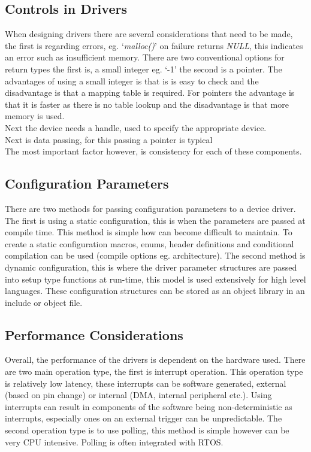 \subsection{Controls in Drivers}
When designing drivers there are several considerations that need to be made, the first is regarding
errors, eg. `\textit{malloc()}' on failure returns \textit{NULL}, this indicates an error such as
insufficient memory. There are two conventional options for return types the first is, a small
integer eg. `-1' the second is a pointer. The advantages of using a small integer is that is is easy
to check and the disadvantage is that a mapping table is required. For pointers the advantage is
that it is faster as there is no table lookup and the disadvantage is that more memory is used.\\

\noindent Next the device needs a handle, used to specify the appropriate device.\\

\noindent Next is data passing, for this passing a pointer is typical\\

\noindent The most important factor however, is consistency for each of these components.

\subsection{Configuration Parameters}
There are two methods for passing configuration parameters to a device driver. The first is using a
static configuration, this is when the parameters are passed at compile time. This method is simple
how can become difficult to maintain. To create a static configuration macros, enums, header
definitions and conditional compilation can be used (compile options eg.
architecture). The second method is dynamic configuration, this is where the driver parameter
structures are passed into setup type functions at run-time, this model is used extensively for high
level languages. These configuration structures can be stored as an object library in an include
or object file.

\subsection{Performance Considerations}
Overall, the performance of the drivers is dependent on the hardware used. There are two main
operation type, the first is interrupt operation. This operation type is relatively low latency,
these interrupts can be software generated, external (based on pin change) or internal (DMA,
internal peripheral etc.). Using interrupts can result in components of the software being
non-deterministic as interrupts, especially ones on an external trigger can be unpredictable. The
second operation type is to use polling, this method is simple however can be very CPU intensive.
Polling is often integrated with RTOS.

